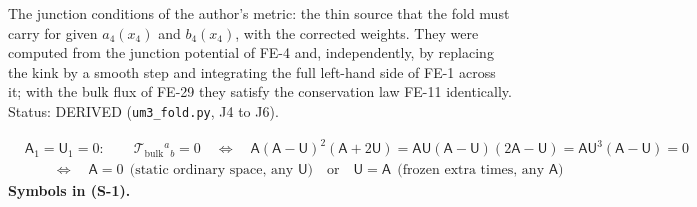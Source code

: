 \documentclass[
  10pt,
]{article}
\begin{document}
The junction conditions of the author's metric: the thin source that the
fold must carry for given \(a_4(x_4)\) and \(b_4(x_4)\), with the
corrected weights. They were computed from the junction potential of
FE-4 and, independently, by replacing the kink by a smooth step and
integrating the full left-hand side of FE-1 across it; with the bulk
flux of FE-29 they satisfy the conservation law FE-11 identically.
Status: DERIVED (\texttt{um3\_fold.py}, J4 to J6).

\[
\begin{aligned}
&\mathsf{A}_1 = \mathsf{U}_1 = 0:\qquad \mathcal{T}_{\mathrm{bulk}}{}^a{}_b = 0\quad\Leftrightarrow\quad
 \mathsf{A}(\mathsf{A} - \mathsf{U})^2(\mathsf{A} + 2\mathsf{U}) = \mathsf{A}\mathsf{U}(\mathsf{A} - \mathsf{U})(2\mathsf{A} - \mathsf{U})
 = \mathsf{A}\mathsf{U}^3(\mathsf{A} - \mathsf{U}) = 0\\
&\qquad\Leftrightarrow\quad \mathsf{A} = 0\ \ \text{(static ordinary space, any } \mathsf{U})\quad\text{or}\quad
 \mathsf{U} = \mathsf{A}\ \ \text{(frozen extra times, any } \mathsf{A})
\end{aligned} \tag{S-1}
\] \textbf{Symbols in (S-1).}
\end{document}
